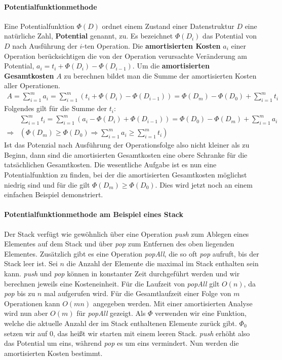 \documentclass[a4paper,12pt]{article}
\begin{document}
\paragraph{Potentialfunktionmethode} \label{potentialfunktionsmethode} Eine Potentialfunktion $\Phi(D)$ ordnet einem Zustand einer Datenstruktur $D$ eine natürliche Zahl, \textbf{Potential} genannt, zu. Es bezeichnet $\Phi(D_i)$ das Potential von $D$ nach Ausführung der $i$-ten Operation. Die \textbf{amortisierten Kosten} $a_i$ einer Operation berücksichtigen die von der Operation verursachte Veränderung am Potential, $a_i = t_i + \Phi(D_{i}) - \Phi(D_{i-1})$. Um die \textbf{amortisierten Gesamtkosten} $A$ zu berechnen bildet man die Summe der amortisierten Kosten aller Operationen. 
\begin{align*}
A = \sum_{i = 1}^{m} a_i =  \sum_{i = 1}^{m} \left(t_i + \Phi\left(D_{i}\right) - \Phi\left(D_{i-1}\right)\right) = \Phi\left(D_{m}\right) - \Phi\left(D_{0}\right) + \sum_{i = 1}^{m} t_i 
\end{align*}
Folgendes gilt für die Summe der $t_i$:
\begin{align*}
&\sum_{i = 1}^{m} t_i =  \sum_{i = 1}^{m} \left(a_i - \Phi\left(D_{i}\right) + \Phi\left(D_{i-1}\right)\right) = \Phi\left(D_{0}\right) - \Phi\left(D_{m}\right) + \sum_{i = 1}^{m} a_i \\
\Rightarrow &\left( \Phi\left(D_{m}\right) \geq \Phi\left(D_{0}\right) \Rightarrow \sum_{i = 1}^{m} a_i \geq \sum_{i = 1}^{m} t_i \right)
\end{align*}
Ist das Potenzial nach Ausführung der Operationsfolge also nicht kleiner als zu Beginn, dann sind die amortisierten Gesamtkosten eine obere Schranke für die tatsächlichen Gesamtkosten. Die wesentliche Aufgabe ist es nun eine Potentialfunktion zu finden, bei der die amortisierten Gesamtkosten möglichst niedrig sind und für die gilt $\Phi\left(D_{m}\right) \geq \Phi\left(D_{0}\right)$. Dies wird jetzt noch an einem einfachen Beispiel demonstriert.

\paragraph{Potentialfunktionmethode am Beispiel eines Stack} 
Der Stack verfügt wie gewöhnlich über eine Operation \textit{push} zum Ablegen eines Elementes auf dem Stack und über \textit{pop} zum Entfernen des oben liegenden Elementes. Zusätzlich gibt es eine Operation \textit{popAll}, die so oft \textit{pop} aufruft, bis der Stack leer ist. Sei $n$ die Anzahl der Elemente die maximal im Stack enthalten sein kann. \textit{push} und \textit{pop} können in konstanter Zeit durchgeführt werden und wir berechnen jeweils eine Kosteneinheit. Für die Laufzeit von \textit{popAll} gilt $O(n)$, da \textit{pop} bis zu $n$ mal aufgerufen wird. Für die Gesamtlaufzeit einer Folge von $m$ Operationen kann $O(mn)$ angegeben werden. Mit einer amortisierten Analyse wird nun aber $O(m)$ für \textit{popAll} gezeigt. Als $\Phi$ verwenden wir eine Funktion, welche die aktuelle Anzahl der im Stack enthaltenen Elemente zurück gibt. $\Phi_0$ setzen wir auf $0$, das heißt wir starten mit einem leeren Stack. \textit{push} erhöht also das Potential um eins, während \textit{pop} es um eins vermindert. Nun werden die amortisierten Kosten bestimmt. 
\end{document}
